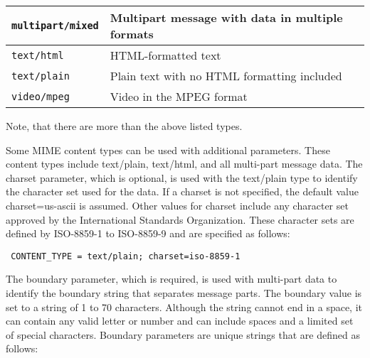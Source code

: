 \begin{description}
\begin{center}
\begin{longtable}{|l|p{9cm}|}
\verb|multipart/mixed| & Multipart message with data in multiple formats\\\hline
\verb|text/html| & HTML-formatted text\\\hline
\verb|text/plain| & Plain text with no HTML formatting included\\\hline
\verb|video/mpeg| & Video in the MPEG format\\\hline
\end{longtable}
\end{center}
Note, that there are more than the above listed types.

Some MIME content types can be used with additional parameters. These content
types include text/plain, text/html, and all multi-part message data. The
charset parameter, which is optional, is used with the text/plain type to
identify the character set used for the data. If a charset is not specified, the
default value charset=us-ascii is assumed. Other values for charset include any
character set approved by the International Standards Organization. These
character sets are defined by ISO-8859-1 to ISO-8859-9 and are specified as
follows:

{\footnotesize
\begin{verbatim}
 CONTENT_TYPE = text/plain; charset=iso-8859-1
\end{verbatim}
}

The boundary parameter, which is required, is used with multi-part data to
identify the boundary string that separates message parts. The boundary value is
set to a string of 1 to 70 characters. Although the string cannot end in a
space, it can contain any valid letter or number and can include spaces and a
limited set of special characters. Boundary parameters are unique strings that
are defined as follows:


\end{description}
